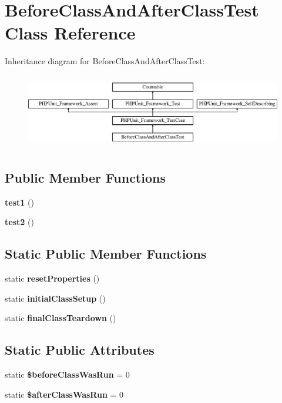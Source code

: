 \section{Before\+Class\+And\+After\+Class\+Test Class Reference}
\label{class_before_class_and_after_class_test}
Inheritance diagram for Before\+Class\+And\+After\+Class\+Test\+:\begin{figure}[H]
\begin{center}
\leavevmode
\includegraphics[height=3.303835cm]{class_before_class_and_after_class_test}
\end{center}
\end{figure}
\subsection*{Public Member Functions}
\begin{DoxyCompactItemize}
\item 
{\bf test1} ()
\item 
{\bf test2} ()
\end{DoxyCompactItemize}
\subsection*{Static Public Member Functions}
\begin{DoxyCompactItemize}
\item 
static {\bf reset\+Properties} ()
\item 
static {\bf initial\+Class\+Setup} ()
\item 
static {\bf final\+Class\+Teardown} ()
\end{DoxyCompactItemize}
\subsection*{Static Public Attributes}
\begin{DoxyCompactItemize}
\item 
static {\bf \$before\+Class\+Was\+Run} = 0
\item 
static {\bf \$after\+Class\+Was\+Run} = 0
\end{DoxyCompactItemize}
